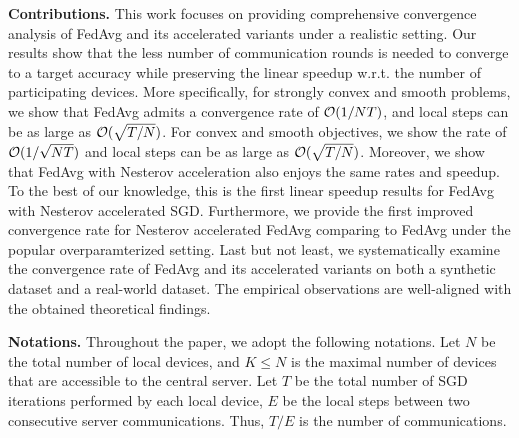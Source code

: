 \textbf{Contributions.}
This work focuses on providing comprehensive convergence analysis
of FedAvg and its accelerated variants under a realistic setting.
Our results show
that the less number of communication rounds is needed to converge to a
target accuracy while preserving the linear speedup w.r.t. the number of participating devices.
More specifically, for strongly convex and smooth problems, we show 
that FedAvg admits a convergence rate of 
{\small{${\mathcal{O}}(1/NT)$}}, and local steps can be as large as {\small{${\mathcal{O}}(\sqrt{T/N})$}}. For convex and smooth objectives, we show the rate of {\small{${\mathcal{O}}(1/\sqrt{NT})$}} and local steps can be as large as {\small{${\mathcal{O}}(\sqrt{T/N})$}}. 
Moreover, we show that FedAvg with Nesterov acceleration also enjoys the same rates and speedup. 
To the best of our knowledge, this is the first linear speedup results for FedAvg with Nesterov accelerated SGD. Furthermore, 
we provide the first improved convergence rate for Nesterov accelerated FedAvg comparing to FedAvg under the popular overparamterized setting. 
Last but not least, we systematically examine the convergence rate of
FedAvg and its accelerated variants on both a synthetic dataset and  a real-world dataset. The empirical observations are well-aligned with the obtained theoretical findings.



\textbf{Notations.}
Throughout the paper, we adopt the following notations. Let $N$ be the total
number of local devices, and $K \leq N$ is the maximal number of devices
that are accessible to the central server.  Let $T$ be the total number of SGD iterations performed by each local device, $E$ be the local steps between two consecutive server communications. Thus, $T/E$ is
the number of communications.

